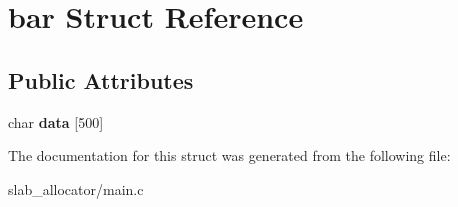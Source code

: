 \hypertarget{structbar}{}\section{bar Struct Reference}
\label{structbar}
\subsection*{Public Attributes}
\begin{DoxyCompactItemize}
\item 
\mbox{\label{structbar_a1ffba8508191d82c82990fc3ed2172b2}} 
char {\bfseries data} \mbox{[}500\mbox{]}
\end{DoxyCompactItemize}


The documentation for this struct was generated from the following file\+:\begin{DoxyCompactItemize}
\item 
slab\+\_\+allocator/main.\+c\end{DoxyCompactItemize}
